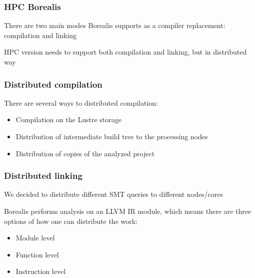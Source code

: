 

\begin{frame}
\frametitle{HPC Borealis}
\begin{block}
	\centering
	There are two main modes Borealis supports as a compiler replacement: compilation and linking
\end{block}

\begin{block}
	\centering
	HPC version needs to support both compilation and linking, but in distributed way
\end{block}
\end{frame}



\begin{frame}
\frametitle{Distributed compilation}
There are several ways to distributed compilation:
\begin{itemize}
	\item Compilation on the Lustre storage
	\item Distribution of intermediate build tree to the processing nodes
	\item Distribution of copies of the analyzed project
\end{itemize} 
\end{frame}


\begin{frame}
\frametitle{Distributed linking}
\begin{block}
	\centering
	We decided to distribute different SMT queries to different nodes/cores
\end{block}	
	Borealis performs analysis on an LLVM IR module, which means there are three options of how one can distribute the work:
\begin{itemize}
	\item Module level
	\item Function level
	\item Instruction level
\end{itemize}
\end{frame}

